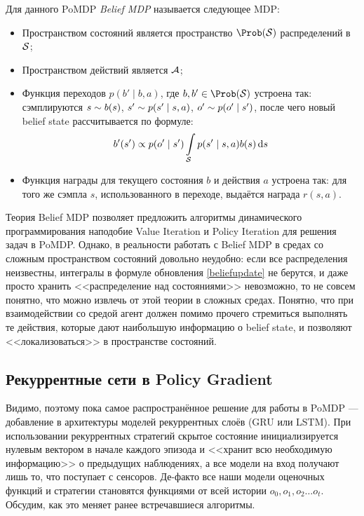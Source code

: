 \begin{definition}
Для данного PoMDP \emph{Belief MDP} называется следующее MDP:
\begin{itemize}
    \item Пространством состояний является пространство $\Prob(\St)$ распределений в $\mathcal{S}$;
    \item Пространством действий является $\mathcal{A}$;
    \item Функция переходов $p(b' \mid b, a)$, где $b, b' \in \Prob(\St)$ устроена так: сэмплируются $s \HM\sim b(s)$, $s' \HM\sim p(s' \HM\mid s, a)$, $o' \HM\sim p(o' \mid s')$, после чего новый belief state рассчитывается по формуле:
    $$b'(s') \propto p(o' \mid s')\int\limits_{\mathcal{S}} p(s' \mid s, a) b(s) \mathop{}\!\mathrm{d} s $$
    \item Функция награды для текущего состояния $b$ и действия $a$ устроена так: для того же сэмпла $s$, использованного в переходе, выдаётся награда $r(s, a)$.
\end{itemize}
\end{definition}

Теория Belief MDP позволяет предложить алгоритмы динамического программирования наподобие Value Iteration и Policy Iteration для решения задач в PoMDP. Однако, в реальности работать с Belief MDP в средах со сложным пространством состояний довольно неудобно: если все распределения неизвестны, интегралы в формуле обновления \eqref{beliefupdate} не берутся, и даже просто хранить <<распределение над состояниями>> невозможно, то не совсем понятно, что можно извлечь от этой теории в сложных средах. Понятно, что при взаимодействии со средой агент должен помимо прочего стремиться выполнять те действия, которые дают наибольшую информацию о belief state, и позволяют <<локализоваться>> в пространстве состояний.

\subsection{Рекуррентные сети в Policy Gradient}

Видимо, поэтому пока самое распространённое решение для работы в PoMDP --- добавление в архитектуры моделей рекуррентных слоёв (GRU или LSTM). При использовании рекуррентных стратегий скрытое состояние инициализируется нулевым вектором в начале каждого эпизода и <<хранит всю необходимую информацию>> о предыдущих наблюдениях, а все модели на вход получают лишь то, что поступает с сенсоров. Де-факто все наши модели оценочных функций и стратегии становятся функциями от всей истории $o_0, o_1, o_2 \dots o_t$. Обсудим, как это меняет ранее встречавшиеся алгоритмы.


